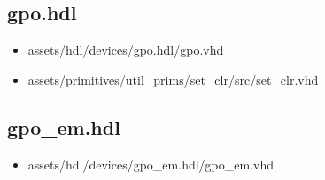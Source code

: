 \subsection*{gpo.hdl}
	\begin{itemize}
		\item assets/hdl/devices/gpo.hdl/gpo.vhd
		\item assets/primitives/util\_prims/set\_clr/src/set\_clr.vhd
	\end{itemize}

\subsection*{gpo\_em.hdl}
	\begin{itemize}
		\item assets/hdl/devices/gpo\_em.hdl/gpo\_em.vhd
	\end{itemize}
	
